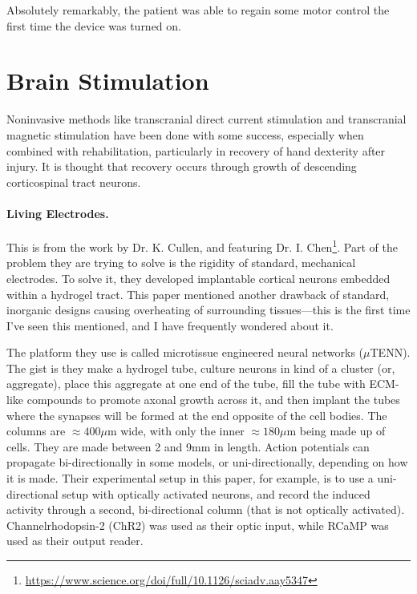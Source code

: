 \documentclass[12pt]{report}
\begin{document}
Absolutely remarkably, the patient was able to regain some motor control the first time the device was turned on. 




\chapter{Brain Stimulation}

Noninvasive methods like transcranial direct current stimulation and transcranial magnetic stimulation have been done with some success, especially when combined with rehabilitation, particularly in recovery of hand dexterity after injury. It is thought that recovery occurs through growth of descending corticospinal tract neurons. 

\subsubsection{Living Electrodes.}

This is from the work by Dr. K. Cullen, and featuring Dr. I. Chen\footnote{\url{https://www.science.org/doi/full/10.1126/sciadv.aay5347}}. Part of the problem they are trying to solve is the rigidity of standard, mechanical electrodes. To solve it, they developed implantable cortical neurons embedded within a hydrogel tract. This paper mentioned another drawback of standard, inorganic designs causing overheating of surrounding tissues---this is the first time I've seen this mentioned, and I have frequently wondered about it.\newline

The platform they use is called microtissue engineered neural networks ($\mu$TENN). The gist is they make a hydrogel tube, culture neurons in kind of a cluster (or, aggregate), place this aggregate at one end of the tube, fill the tube with ECM-like compounds to promote axonal growth across it, and then implant the tubes where the synapses will be formed at the end opposite of the cell bodies. The columns are $\approx 400\mu$m wide, with only the inner $\approx 180\mu$m being made up of cells. They are made between 2 and 9mm in length. Action potentials can propagate bi-directionally in some models, or uni-directionally, depending on how it is made. Their experimental setup in this paper, for example, is to use a uni-directional setup with optically activated neurons, and record the induced activity through a second, bi-directional column (that is not optically activated). Channelrhodopsin-2 (ChR2) was used as their optic input, while RCaMP was used as their output reader. \newline
\end{document}
